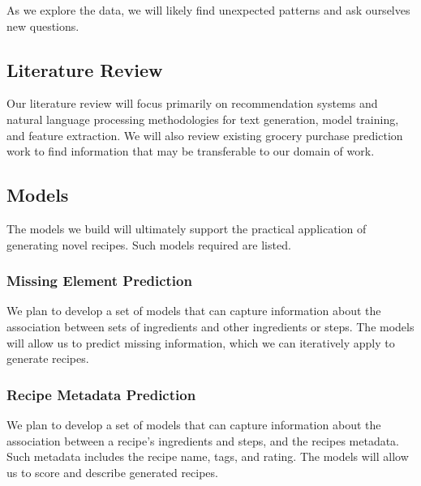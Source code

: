 \documentclass[sigconf]{acmart}
\begin{document}
As we explore the data, we will likely find unexpected patterns and ask ourselves new questions.

\subsection{Literature Review}
Our literature review will focus primarily on recommendation systems and natural language processing methodologies for text generation, model training, and feature extraction. We will also review existing grocery purchase prediction work to find information that may be transferable to our domain of work.


\subsection{Models}
The models we build will ultimately support the practical application of generating novel recipes. Such models required are listed.

\subsubsection{Missing Element Prediction}
We plan to develop a set of models that can capture information about the association between sets of ingredients and other ingredients or steps. The models will allow us to predict missing information, which we can iteratively apply to generate recipes.

\subsubsection{Recipe Metadata Prediction}
We plan to develop a set of models that can capture information about the association between a recipe's ingredients and steps, and the recipes metadata. Such metadata includes the recipe name, tags, and rating. The models will allow us to score and describe generated recipes.
\end{document}
